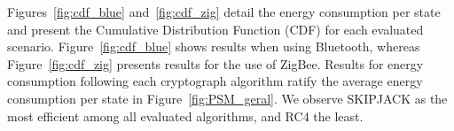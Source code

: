 Figures~\ref{fig:cdf_blue} and~\ref{fig:cdf_zig} %
detail the  energy consumption per state and  present the Cumulative Distribution Function (CDF) for each evaluated scenario. Figure~\ref{fig:cdf_blue} shows results when using Bluetooth, whereas Figure~\ref{fig:cdf_zig} presents results for the use of ZigBee. %
Results for energy consumption following each cryptograph algorithm ratify the average energy consumption %
per state in Figure~\ref{fig:PSM_geral}. %
We observe SKIPJACK as the most efficient among all evaluated algorithms, and RC4 the least. %

